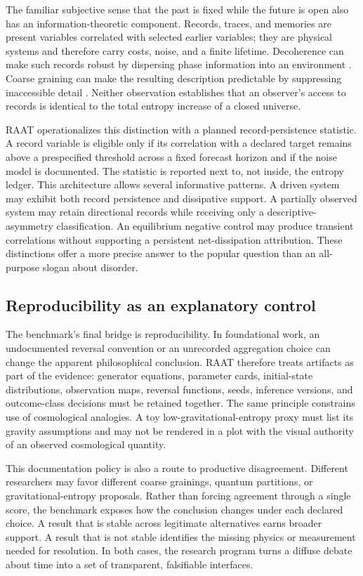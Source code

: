 The familiar subjective sense that the past is fixed while the future is open also has an information-theoretic component. Records, traces, and memories are present variables correlated with selected earlier variables; they are physical systems and therefore carry costs, noise, and a finite lifetime. Decoherence can make such records robust by dispersing phase information into an environment \cite{zurek1993}. Coarse graining can make the resulting description predictable by suppressing inaccessible detail \cite{gellmann_hartle2007}. Neither observation establishes that an observer's access to records is identical to the total entropy increase of a closed universe.

RAAT operationalizes this distinction with a planned record-persistence statistic. A record variable is eligible only if its correlation with a declared target remains above a prespecified threshold across a fixed forecast horizon and if the noise model is documented. The statistic is reported next to, not inside, the entropy ledger. This architecture allows several informative patterns. A driven system may exhibit both record persistence and dissipative support. A partially observed system may retain directional records while receiving only a descriptive-asymmetry classification. An equilibrium negative control may produce transient correlations without supporting a persistent net-dissipation attribution. These distinctions offer a more precise answer to the popular question than an all-purpose slogan about disorder.

\subsection{Reproducibility as an explanatory control}

The benchmark's final bridge is reproducibility. In foundational work, an undocumented reversal convention or an unrecorded aggregation choice can change the apparent philosophical conclusion. RAAT therefore treats artifacts as part of the evidence: generator equations, parameter cards, initial-state distributions, observation maps, reversal functions, seeds, inference versions, and outcome-class decisions must be retained together. The same principle constrains use of cosmological analogies. A toy low-gravitational-entropy proxy must list its gravity assumptions and may not be rendered in a plot with the visual authority of an observed cosmological quantity.

This documentation policy is also a route to productive disagreement. Different researchers may favor different coarse grainings, quantum partitions, or gravitational-entropy proposals. Rather than forcing agreement through a single score, the benchmark exposes how the conclusion changes under each declared choice. A result that is stable across legitimate alternatives earns broader support. A result that is not stable identifies the missing physics or measurement needed for resolution. In both cases, the research program turns a diffuse debate about time into a set of transparent, falsifiable interfaces.

